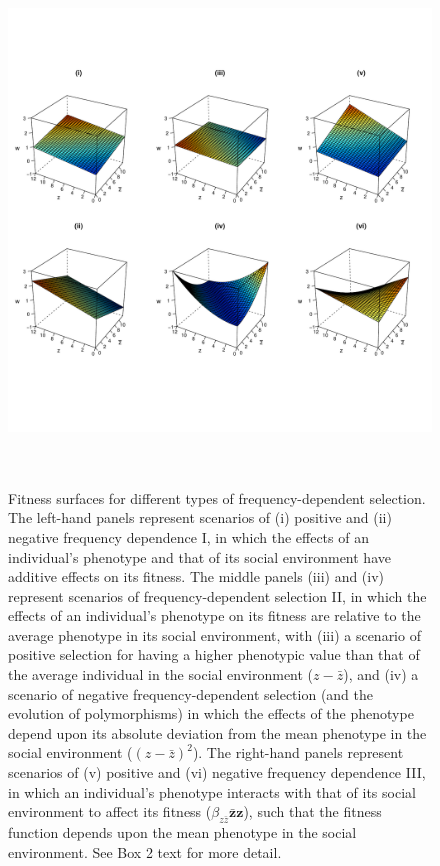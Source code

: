 \documentclass{article}
\begin{document}
\begin{figure}[H] 
	\renewcommand{\figurename}{Figure B2.}
	\centering
	\includegraphics[width=14cm, height=14cm]{Figures/Box2.pdf}
	\let\nobreakspace\relax
	\caption{Fitness surfaces for different types of frequency-dependent selection. The left-hand panels represent scenarios of (i) positive and (ii) negative frequency dependence I, in which the effects of an individual's phenotype and that of its social environment have additive effects on its fitness. The middle panels (iii) and (iv) represent scenarios of frequency-dependent selection II, in which the effects of an individual's phenotype on its fitness are relative to the average phenotype in its social environment, with (iii) a scenario of positive selection for having a higher phenotypic value than that of the average individual in the social environment ($z-\bar{z}$), and (iv) a scenario of negative frequency-dependent selection (and the evolution of polymorphisms) in which the effects of the phenotype depend upon its absolute deviation from the mean phenotype in the social environment ($(z-\bar{z})^2$). The right-hand panels represent scenarios of (v) positive and (vi) negative frequency dependence III, in which an individual's phenotype interacts with that of its social environment to affect its fitness ($\beta_{z\bar{z}} \mathbf{\bar{z}z}$), such that the fitness function depends upon the mean phenotype in the social environment. See Box 2 text for more detail.}
	
\end{figure}
\end{document}
